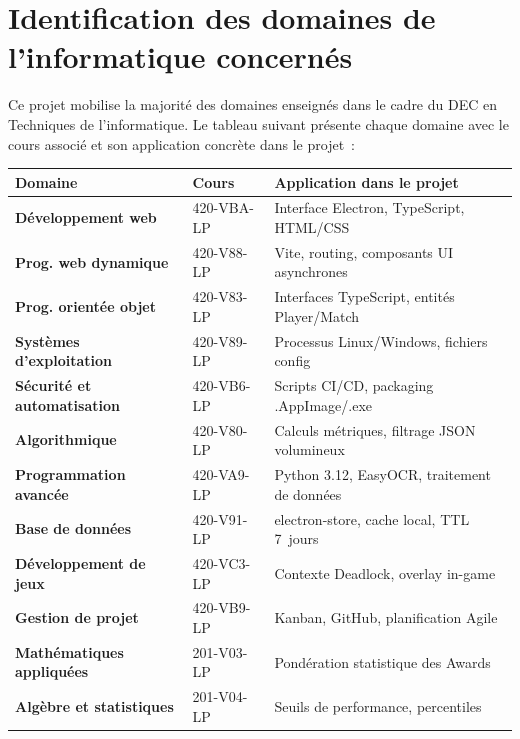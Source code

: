 \documentclass[12pt,a4paper]{article}
\begin{document}
\section{Identification des domaines de l'informatique concernés}

Ce projet mobilise la majorité des domaines enseignés dans le cadre du DEC
en Techniques de l'informatique. Le tableau suivant présente chaque domaine
avec le cours associé et son application concrète dans le projet~:

\vspace{0.5em}
\begin{center}
\begin{tabular}{>{\bfseries}p{4.2cm} p{2.5cm} p{6.5cm}}
\toprule
Domaine & Cours & Application dans le projet \\
\midrule
Développement web & 420-VBA-LP & Interface Electron, TypeScript, HTML/CSS \\
Prog. web dynamique & 420-V88-LP & Vite, routing, composants UI asynchrones \\
Prog. orientée objet & 420-V83-LP & Interfaces TypeScript, entités Player/Match \\
Systèmes d'exploitation & 420-V89-LP & Processus Linux/Windows, fichiers config \\
Sécurité et automatisation & 420-VB6-LP & Scripts CI/CD, packaging .AppImage/.exe \\
Algorithmique & 420-V80-LP & Calculs métriques, filtrage JSON volumineux \\
Programmation avancée & 420-VA9-LP & Python 3.12, EasyOCR, traitement de données \\
Base de données & 420-V91-LP & electron-store, cache local, TTL 7~jours \\
Développement de jeux & 420-VC3-LP & Contexte Deadlock, overlay in-game \\
Gestion de projet & 420-VB9-LP & Kanban, GitHub, planification Agile \\
Mathématiques appliquées & 201-V03-LP & Pondération statistique des Awards \\
Algèbre et statistiques & 201-V04-LP & Seuils de performance, percentiles \\
\bottomrule
\end{tabular}
\end{center}

\end{document}
